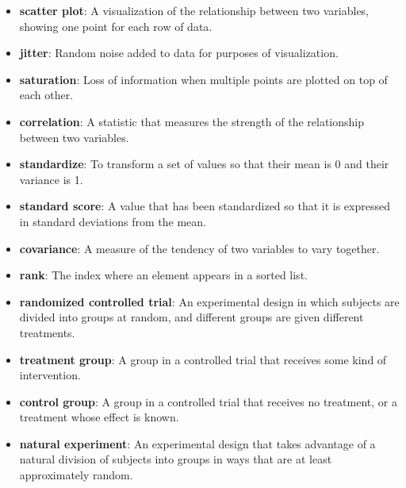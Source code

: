 \documentclass[12pt]{book}
\begin{document}
\begin{itemize}

\item {\bf scatter plot}: A visualization of the relationship between
two variables, showing one point for each row of data.

\item {\bf jitter}: Random noise added to data for purposes of
visualization.

\item {\bf saturation}: Loss of information when multiple points are
plotted on top of each other. 

\item {\bf correlation}: A statistic that measures the strength of the
relationship between two variables.

\item {\bf standardize}: To transform a set of values so that their mean is 0 and
their variance is 1.

\item {\bf standard score}: A value that has been standardized so that it is
  expressed in standard deviations from the mean.

\item {\bf covariance}: A measure of the tendency of two variables
to vary together.

\item {\bf rank}: The index where an element appears in a sorted list.

\item {\bf randomized controlled trial}: An experimental design in which subjects
are divided into groups at random, and different groups are given different
treatments.

\item {\bf treatment group}: A group in a controlled trial that receives
some kind of intervention.

\item {\bf control group}: A group in a controlled trial that receives no
treatment, or a treatment whose effect is known.

\item {\bf natural experiment}: An experimental design that takes advantage of
a natural division of subjects into groups in ways that are at least
approximately random.

\end{itemize}
\end{document}
